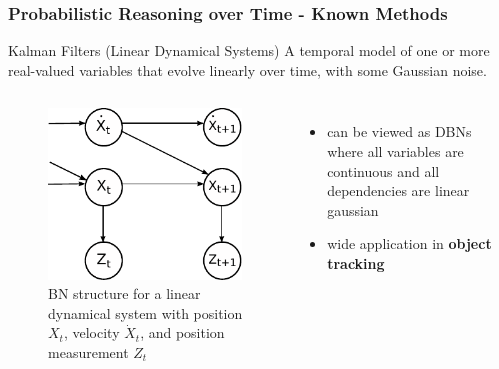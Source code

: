 \begin{frame}[t]
    \frametitle{Probabilistic Reasoning over Time - Known Methods}
  
  \begin{block}{Kalman Filters (Linear Dynamical Systems)}
  	A temporal model of one or more real-valued variables that \alert{evolve linearly} over time, with some 
  	\alert{Gaussian noise}.
  \end{block}
  
  \begin{columns}[T]
  	\begin{figure}
  		\centering
  		\includegraphics[height=0.35\textheight]{images/kalman_filter_simple.pdf}
  		\caption{\tiny{BN structure for a linear dynamical system with position $X_t$, 
  		velocity $\dot{X}_t$, and position measurement $Z_t$}}
  	\end{figure}
	  
  	\begin{itemize}
  	\item \footnotesize{can be viewed as DBNs where all variables are continuous and all dependencies are 
  		linear gaussian}
  	\item \footnotesize{wide application in \textbf{object tracking}}
  \end{itemize}
  \end{columns}
  
\end{frame}

